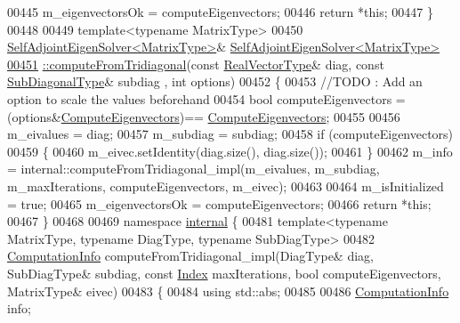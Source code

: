 \begin{DoxyCode}
00445   m\_eigenvectorsOk = computeEigenvectors;
00446   \textcolor{keywordflow}{return} *\textcolor{keyword}{this};
00447 \}
00448 
00449 \textcolor{keyword}{template}<\textcolor{keyword}{typename} MatrixType>
00450 \hyperlink{group___eigenvalues___module_class_eigen_1_1_self_adjoint_eigen_solver}{SelfAdjointEigenSolver<MatrixType>}& 
      \hyperlink{group___eigenvalues___module_a297893df7098c43278d385e4d4e23fe4}{SelfAdjointEigenSolver<MatrixType>}
\hyperlink{group___eigenvalues___module_a297893df7098c43278d385e4d4e23fe4}{00451} \hyperlink{group___eigenvalues___module_a297893df7098c43278d385e4d4e23fe4}{::computeFromTridiagonal}(\textcolor{keyword}{const} \hyperlink{class_eigen_1_1internal_1_1_tensor_lazy_evaluator_writable}{RealVectorType}& diag, \textcolor{keyword}{const} 
      \hyperlink{group___core___module_class_eigen_1_1_matrix}{SubDiagonalType}& subdiag , \textcolor{keywordtype}{int} options)
00452 \{
00453   \textcolor{comment}{//TODO : Add an option to scale the values beforehand}
00454   \textcolor{keywordtype}{bool} computeEigenvectors = (options&\hyperlink{group__enums_ggae3e239fb70022eb8747994cf5d68b4a9ada93d8885bde32b876ba4af01d3292cc}{ComputeEigenvectors})==
      \hyperlink{group__enums_ggae3e239fb70022eb8747994cf5d68b4a9ada93d8885bde32b876ba4af01d3292cc}{ComputeEigenvectors};
00455 
00456   m\_eivalues = diag;
00457   m\_subdiag = subdiag;
00458   \textcolor{keywordflow}{if} (computeEigenvectors)
00459   \{
00460     m\_eivec.setIdentity(diag.size(), diag.size());
00461   \}
00462   m\_info = internal::computeFromTridiagonal\_impl(m\_eivalues, m\_subdiag, m\_maxIterations, 
      computeEigenvectors, m\_eivec);
00463 
00464   m\_isInitialized = \textcolor{keyword}{true};
00465   m\_eigenvectorsOk = computeEigenvectors;
00466   \textcolor{keywordflow}{return} *\textcolor{keyword}{this};
00467 \}
00468 
00469 \textcolor{keyword}{namespace }\hyperlink{namespaceinternal}{internal} \{
00481 \textcolor{keyword}{template}<\textcolor{keyword}{typename} MatrixType, \textcolor{keyword}{typename} DiagType, \textcolor{keyword}{typename} SubDiagType>
00482 \hyperlink{group__enums_ga85fad7b87587764e5cf6b513a9e0ee5e}{ComputationInfo} computeFromTridiagonal\_impl(DiagType& diag, SubDiagType& subdiag, \textcolor{keyword}{const} 
      \hyperlink{group___eigenvalues___module_a8a59ab7734b6eae2754fd78bc7c3a360}{Index} maxIterations, \textcolor{keywordtype}{bool} computeEigenvectors, MatrixType& eivec)
00483 \{
00484   \textcolor{keyword}{using} std::abs;
00485 
00486   \hyperlink{group__enums_ga85fad7b87587764e5cf6b513a9e0ee5e}{ComputationInfo} info;

\end{DoxyCode}
